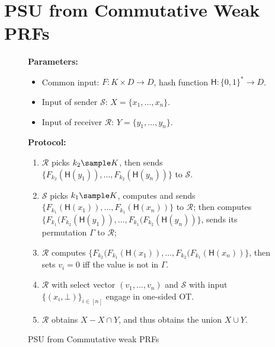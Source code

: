 \section{PSU from Commutative Weak PRFs}
\begin{figure}[!hbtp]
\begin{framed}
\begin{minipage}[center]{\textwidth}
\begin{trivlist}
\item \textbf{Parameters:} 
\begin{itemize}
    \item Common input: $F: K \times D \rightarrow D$, hash function $\mathsf{H}: \{0,1\}^* \rightarrow D$. 

    \item Input of sender $\mathcal{S}$: $X = \{x_1, \dots, x_n\}$.

    \item Input of receiver $\mathcal{R}$: $Y = \{y_1, \dots, y_n\}$. 
\end{itemize}

\item \textbf{Protocol:}

\begin{enumerate}
\item $\mathcal{R}$ picks $k_2 \sample K$, 
    then sends $\{F_{k_2}(\mathsf{H}(y_1)), \dots, F_{k_2}(\mathsf{H}(y_n))\}$ to $\mathcal{S}$. 

\item $\mathcal{S}$ picks $k_1 \sample K$, 
    computes and sends $\{F_{k_1}(\mathsf{H}(x_1)), \dots, F_{k_1}(\mathsf{H}(x_n))\}$ to $\mathcal{R}$; 
    then computes $\{F_{k_1}(F_{k_2}(\mathsf{H}(y_1)), \dots, F_{k_1}(F_{k_2}(\mathsf{H}(y_n))\}$, 
    sends its permutation $\Gamma$ to $\mathcal{R}$; 

\item $\mathcal{R}$ computes $\{F_{k_2}(F_{k_1}(\mathsf{H}(x_1)), \dots, F_{k_2}(F_{k_1}(\mathsf{H}(x_n))\}$, 
    then sets $v_i = 0$ iff the value is not in $\Gamma$. 

\item $\mathcal{R}$ with select vector $(v_1, \dots, v_n)$ and $\mathcal{S}$ 
    with input $\{(x_i, \bot)\}_{i \in [n]}$ engage in one-sided OT. 

\item $\mathcal{R}$ obtains $X - X \cap Y$, and thus obtains the union $X \cup Y$.  
\end{enumerate}
\end{trivlist}
\end{minipage}
\end{framed}
\caption{PSU from Commutative weak PRFs}\label{fig:PSU-from-commutative-functions}
\end{figure} 

